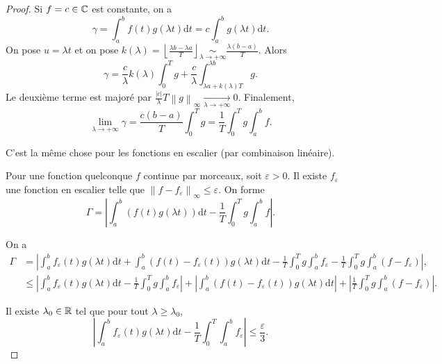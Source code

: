 \documentclass[12pt]{article}
\begin{document}
\begin{proof}
    Si $f=c\in\mathbb{C}$ est constante, on a 
    \begin{equation}
        \gamma=\int_{a}^{b}f(t)g(\lambda t)\mathrm{d}t=c\int_{a}^{b}g(\lambda t)\mathrm{d}t.
    \end{equation}
    On pose $u=\lambda t$ et on pose $k(\lambda)=\left\lfloor\frac{\lambda b-\lambda a}{T}\right\rfloor\underset{\lambda\to+\infty}{\sim}\frac{\lambda(b-a)}{T}$. Alors 
    \begin{equation}
        \gamma=\frac{c}{\lambda}k(\lambda)\int_{0}^{T}g+\frac{c}{\lambda}\int_{\lambda a+k(\lambda)T}^{\lambda b}g.
    \end{equation}
    Le deuxième terme est majoré par $\frac{\left\lvert c\right\rvert}{\lambda}T\left\lVert g\right\rVert_{\infty}\xrightarrow[\lambda\to+\infty]{}0$. Finalement,
    \begin{equation}
        \lim\limits_{\lambda\to+\infty}\gamma=\frac{c(b-a)}{T}\int_{0}^{T}g=\frac{1}{T}\int_{0}^{T}g\int_{a}^{b}f.
    \end{equation}

    C'est la même chose pour les fonctions en escalier (par combinaison linéaire).

    Pour une fonction quelconque $f$ continue par morceaux, soit $\varepsilon>0$. Il existe $f_{\varepsilon}$ une fonction en escalier telle que $\left\lVert f-f_{\varepsilon}\right\rVert_{\infty}\leqslant\varepsilon$. On forme 
    \begin{equation}
        \Gamma=\left\lvert\int_{a}^{b}(f(t)g(\lambda t))\mathrm{d}t-\frac{1}{T}\int_{0}^{T}g\int_{a}^{b}f\right\rvert.
    \end{equation}

    On a 
    \begin{align}
        \Gamma
        &=\left\lvert \int_{a}^{b}f_{\varepsilon}(t)g(\lambda t)\mathrm{d}t+\int_{a}^{b}(f(t)-f_{\varepsilon}(t))g(\lambda t)\mathrm{d}t-\frac{1}{T}\int_{0}^{T}g\int_{a}^{b}f_{\varepsilon}-\frac{1}{T}\int_{0}^{T}g\int_{a}^{b}(f-f_{\varepsilon})\right\rvert,\\
        &\leqslant \left\lvert \int_{a}^{b}f_{\varepsilon}(t)g(\lambda t)\mathrm{d}t-\frac{1}{T}\int_{0}^{T}g\int_{a}^{b}f_{\varepsilon}\right\rvert+\left\lvert \int_{a}^{b}(f(t)-f_{\varepsilon}(t))g(\lambda t)\mathrm{d}t\right\rvert+\left\lvert\frac{1}{T}\int_{0}^{T}g\int_{a}^{b}(f-f_{\varepsilon})\right\rvert.
    \end{align}

    Il existe $\lambda_{0}\in\mathbb{R}$ tel que pour tout $\lambda\geqslant\lambda_{0}$,
    \begin{equation}
        \left\lvert\int_{a}^{b}f_{\varepsilon}(t)g(\lambda t)\mathrm{d}t-\frac{1}{T}\int_{0}^{T}\int_{a}^{b}f_{\varepsilon}\right\rvert\leqslant\frac{\varepsilon}{3}.
    \end{equation}


\end{proof}
\end{document}
